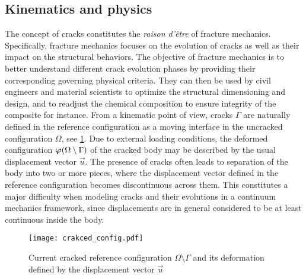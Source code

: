 \subsection{Kinematics and physics}
The concept of cracks constitutes the \emph{raison d'être} of fracture mechanics. Specifically, fracture mechanics focuses on the evolution of cracks as well as their impact on the structural behaviors. The objective of fracture mechanics is to better understand different crack evolution phases by providing their corresponding governing physical criteria. They can then be used by civil engineers and material scientists to optimize the structural dimensioning and design, and to readjust the chemical composition to ensure integrity of the composite for instance. From a kinematic point of view, cracks $\Gamma$ are naturally defined in the reference configuration as a moving interface in the uncracked configuration $\Omega$, see \cref{fig:crackedconfig}. Due to external loading conditions, the deformed configuration $\vphi(\Omega\setminus\Gamma)$ of the cracked body may be described by the usual displacement vector $\vec{u}$. The presence of cracks often leads to separation of the body into two or more pieces, where the displacement vector defined in the reference configuration becomes discontinuous across them. This constitutes a major difficulty when modeling cracks and their evolutions in a continuum mechanics framework, since displacements are in general considered to be at least continuous inside the body.
\begin{figure}[htbp]
\centering
\texttt{[image: crakced\_config.pdf]}
\caption{Current cracked reference configuration $\Omega\setminus\Gamma$ and its deformation defined by the displacement vector $\vec{u}$} \label{fig:crackedconfig}
\end{figure}

